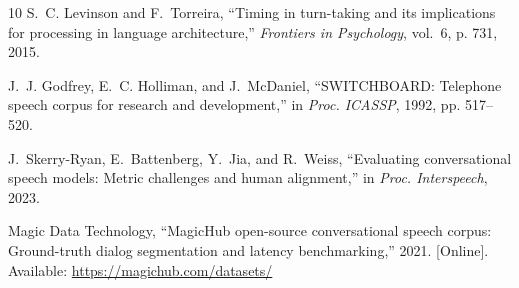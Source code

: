 \documentclass[10pt,journal,compsoc]{IEEEtran}
\begin{document}
\begin{thebibliography}{10}
S.~C. Levinson and F.~Torreira, ``Timing in turn-taking and its implications for processing in language architecture,'' \emph{Frontiers in Psychology}, vol.~6, p. 731, 2015.

J.~J. Godfrey, E.~C. Holliman, and J.~McDaniel, ``SWITCHBOARD: Telephone speech corpus for research and development,'' in \emph{Proc. ICASSP}, 1992, pp. 517--520.

J.~Skerry-Ryan, E.~Battenberg, Y.~Jia, and R.~Weiss, ``Evaluating conversational speech models: Metric challenges and human alignment,'' in \emph{Proc. Interspeech}, 2023.

Magic Data Technology, ``MagicHub open-source conversational speech corpus: Ground-truth dialog segmentation and latency benchmarking,'' 2021. [Online]. Available: \url{https://magichub.com/datasets/}

\end{thebibliography}
\end{document}
